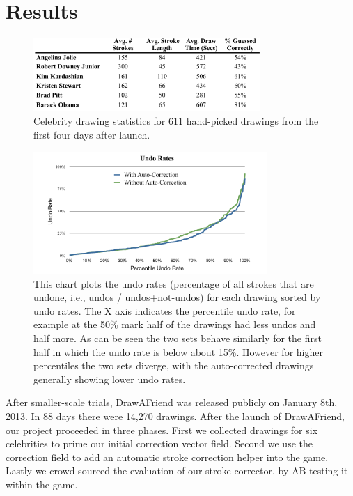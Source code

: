 \section{Results}
\begin{figure}
  \centering%
\includegraphics[height=1.1in]{./figures/daf-stats-cropped.pdf}
  \caption{Celebrity drawing statistics for 611 hand-picked drawings from the first four days after launch.}
  \label{fig:daf-stats}
\end{figure}


\begin{figure}
  \centering%
\includegraphics[width=3.5in]{./figures/userstudy/undoRates_chart_cropped.pdf}
  \caption{This chart plots the undo rates (percentage of all strokes that are undone, i.e., undos / undos+not-undos) for
each drawing sorted by undo rates. The X axis indicates the percentile undo rate, for example at the 50\% mark half of the
drawings had less undos and half more. As can be seen the two sets behave similarly for the first half in which the undo
rate is below about 15\%. However for higher percentiles the two sets diverge, with the auto-corrected drawings generally
showing lower undo rates.}
  \label{fig:daf-undos}
\end{figure}



After smaller-scale trials, DrawAFriend was released publicly on January 8th, 2013. In 88 days there were 14,270 drawings. After the launch of DrawAFriend, our project proceeded in three phases. First we collected drawings for six celebrities to prime our initial correction vector field. Second we use the correction field to add an automatic stroke correction helper into the game. Lastly we crowd sourced the evaluation of our stroke corrector, by AB testing it within the game.

